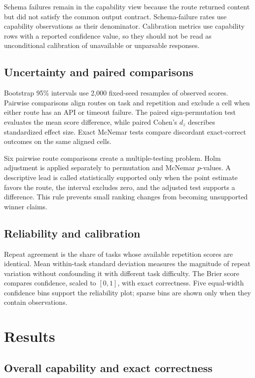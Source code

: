 \documentclass[11pt]{article}
\begin{document}
Schema failures remain in the capability view because the route returned content but did not satisfy the common output contract. Schema-failure rates use capability observations as their denominator. Calibration metrics use capability rows with a reported confidence value, so they should not be read as unconditional calibration of unavailable or unparsable responses.

\subsection{Uncertainty and paired comparisons}

Bootstrap 95\% intervals use 2,000 fixed-seed resamples of observed scores. Pairwise comparisons align routes on task and repetition and exclude a cell when either route has an API or timeout failure. The paired sign-permutation test evaluates the mean score difference, while paired Cohen's $d_z$ describes standardized effect size. Exact McNemar tests compare discordant exact-correct outcomes on the same aligned cells.

Six pairwise route comparisons create a multiple-testing problem. Holm adjustment is applied separately to permutation and McNemar $p$-values. A descriptive lead is called statistically supported only when the point estimate favors the route, the interval excludes zero, and the adjusted test supports a difference. This rule prevents small ranking changes from becoming unsupported winner claims.

\subsection{Reliability and calibration}

Repeat agreement is the share of tasks whose available repetition scores are identical. Mean within-task standard deviation measures the magnitude of repeat variation without confounding it with different task difficulty. The Brier score compares confidence, scaled to $[0,1]$, with exact correctness. Five equal-width confidence bins support the reliability plot; sparse bins are shown only when they contain observations.

\section{Results}

\subsection{Overall capability and exact correctness}
\end{document}
